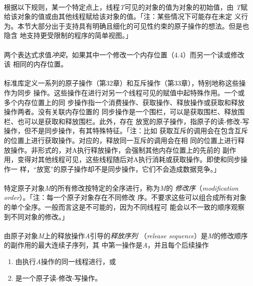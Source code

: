 \paragraph{}
根据以下规则，某一个特定点上，线程\textit{T}可见的对象的值为对象的初始值，由
\textit{T}赋给该对象的值或由其他线程赋给该对象的值。「注：某些情况下可能存在未定
义行为。本节大部分出于支持具有明确且细化的可见性约束的原子操作的想法。但是也隐含
地支持更受限制的程序的简单视图。」

\paragraph{}
两个表达式求值\textit{冲突}，如果其中一个修改一个内存位置（4.4）而另一个读或修改该
相同的内存位置。

\paragraph{}
标准库定义一系列的原子操作（第32章）和互斥操作（第33章），特别地称这些操作为同步
操作。这些操作在进行对另一个线程可见的赋值中起特殊作用。一个或多个内存位置上的同
步操作指一个消费操作、获取操作、释放操作或获取和释放操作两者。没有关联内存位置的
同步操作是一个围栏，可以是获取围栏、释放围栏、也可以是获取和释放围栏。此外，存在
放宽的原子操作，指原子的读-修改-写操作，但不是同步操作，有其特殊特征。「注：比如
获取互斥的调用会在包含互斥的位置上进行获取操作。对应的，释放同一互斥的调用会在相
同的位置上进行释放操作。非形式的，对A执行释放操作，会强制其他内存位置上的先前的
副作用，变得对其他线程可见，这些线程随后对A执行消耗或获取操作。即使和同步操作一
样，``放宽''的原子操作却不是同步操作，它们不会造成数据竞争。」

\paragraph{}
特定原子对象\textit{M}的所有修改按特定的全序进行，称为\textit{M}的
\textit{修改序}（\textit{modification order}）。「注：每一个原子对象存在不同修改
序。不要求这些可以组合成所有对象的单个全序。一般而言这是不可能的，因为不同线程可
能会以不一致的顺序观察到不同对象的修改。」

\paragraph{}
由原子对象\textit{M}上的释放操作\textit{A}引导的\textit{释放序列}
（\textit{release  sequence}）是\textit{M}的修改顺序的副作用的最大连续子序列，其
中第一操作是\textit{A}，并且每个后续操作
\begin{enumerate}
  \item{由执行\textit{A}操作的同一线程进行，或}
  \item{是一个原子读-修改-写操作。}
\end{enumerate}

